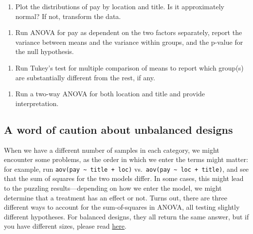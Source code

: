 \documentclass[
  letterpaper,
  DIV=11,
  numbers=noendperiod]{scrreprt}
\providecommand{\tightlist}{%
  \setlength{\itemsep}{0pt}\setlength{\parskip}{0pt}}\usepackage{longtable,booktabs,array}
\begin{document}
\begin{enumerate}
\def\labelenumi{\arabic{enumi}.}
\tightlist
\item
  Plot the distributions of pay by location and title. Is it
  approximately normal? If not, transform the data.
\end{enumerate}

\begin{enumerate}
\def\labelenumi{\arabic{enumi}.}
\setcounter{enumi}{1}
\tightlist
\item
  Run ANOVA for pay as dependent on the two factors separately, report
  the variance between means and the variance within groups, and the
  p-value for the null hypothesis.
\end{enumerate}

\begin{enumerate}
\def\labelenumi{\arabic{enumi}.}
\setcounter{enumi}{2}
\tightlist
\item
  Run Tukey's test for multiple comparison of means to report which
  group(s) are substantially different from the rest, if any.
\end{enumerate}

\begin{enumerate}
\def\labelenumi{\arabic{enumi}.}
\setcounter{enumi}{3}
\tightlist
\item
  Run a two-way ANOVA for both location and title and provide
  interpretation.
\end{enumerate}

\hypertarget{a-word-of-caution-about-unbalanced-designs}{%
\subsection{A word of caution about unbalanced
designs}\label{a-word-of-caution-about-unbalanced-designs}}

When we have a different number of samples in each category, we might
encounter some problems, as the order in which we enter the terms might
matter: for example, run
\texttt{aov(pay\ \textasciitilde{}\ title\ +\ loc)}
vs.~\texttt{aov(pay\ \textasciitilde{}\ loc\ +\ title)}, and see that
the sum of squares for the two models differ. In some cases, this might
lead to the puzzling results---depending on how we enter the model, we
might determine that a treatment has an effect or not. Turns out, there
are three different ways to account for the sum-of-squares in ANOVA, all
testing slightly different hypotheses. For balanced designs, they all
return the same answer, but if you have different sizes, please read
\href{https://mcfromnz.wordpress.com/2011/03/02/anova-type-iiiiii-ss-explained/}{here}.
\end{document}
